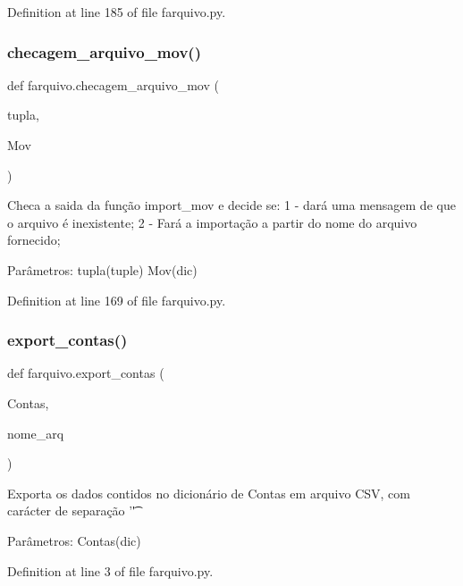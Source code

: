 Definition at line 185 of file farquivo.\+py.

\mbox{\label{namespacefarquivo_a38e8b5a280e9e50150c5d0ecea6e2ae2}} 
\subsubsection{checagem\_arquivo\_mov()}
{\footnotesize\ttfamily def farquivo.\+checagem\+\_\+arquivo\+\_\+mov (\begin{DoxyParamCaption}\item[{}]{tupla,  }\item[{}]{Mov }\end{DoxyParamCaption})}

\begin{DoxyVerb}Checa a saida da função import_mov e decide se:
1 - dará uma mensagem de que o arquivo é inexistente;
2 - Fará a importação a partir do nome do arquivo fornecido;

Parâmetros:
tupla(tuple)
Mov(dic)
\end{DoxyVerb}
 

Definition at line 169 of file farquivo.\+py.

\mbox{\label{namespacefarquivo_aa7197dba3ff50f9ab690c03c5f6746bb}} 
\subsubsection{export\_contas()}
{\footnotesize\ttfamily def farquivo.\+export\+\_\+contas (\begin{DoxyParamCaption}\item[{}]{Contas,  }\item[{}]{nome\+\_\+arq }\end{DoxyParamCaption})}

\begin{DoxyVerb}Exporta os dados contidos no dicionário de Contas em arquivo CSV, com carácter de separação '\t'

Parâmetros:
Contas(dic)\end{DoxyVerb}
 

Definition at line 3 of file farquivo.\+py.

\mbox{\label{namespacefarquivo_a61d9bc57ad8dfdad6ec4291b6a99f7fa}} 
